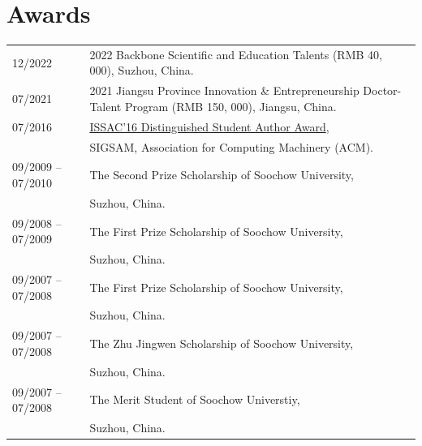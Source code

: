 \documentclass[a4paper,12pt]{article}
\begin{document}
\section*{\Large{Awards}}
\begin{tabular}{@{}p{1.4in}p{4in}}
12/2022 &  2022 Backbone Scientific and Education Talents (RMB 40, 000), Suzhou, China.  \\
07/2021         & 2021 Jiangsu Province Innovation \& Entrepreneurship Doctor-Talent Program (RMB 150, 000), 
                       Jiangsu, China. \\
07/2016               & \href{https://www.sigsam.org/Awards/ISSACAwards.html}{ISSAC'16 Distinguished Student Author Award}, \\
                      & SIGSAM, Association for Computing Machinery (ACM). \\
09/2009 -- 07/2010    & The Second Prize Scholarship of Soochow University, \\ 
                      & Suzhou, China.\\
09/2008 -- 07/2009    & The First Prize Scholarship of Soochow University, \\ 
                      & Suzhou, China.\\
09/2007 -- 07/2008    & The First Prize Scholarship of Soochow University, \\ 
                      & Suzhou, China.\\
09/2007 -- 07/2008    & The Zhu Jingwen Scholarship of Soochow University, \\ 
                      & Suzhou, China.\\
09/2007 -- 07/2008    & The Merit Student of Soochow Universtiy, \\ 
                      & Suzhou, China.\\
\end{tabular}
\end{document}

